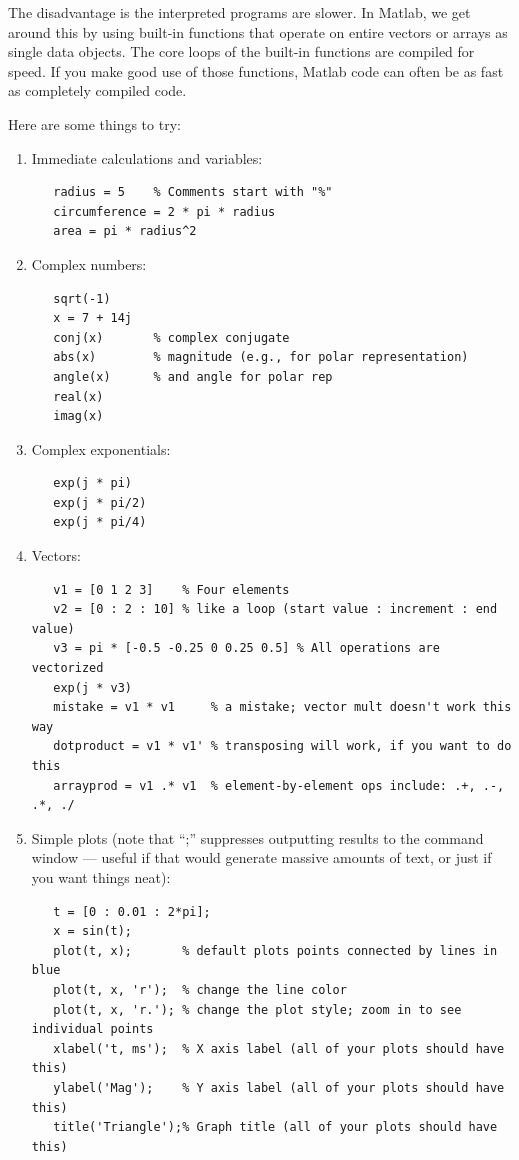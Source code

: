The disadvantage is the interpreted programs are slower. In Matlab, we
get around this by using built-in functions that operate on entire
vectors or arrays as single data objects. The core loops of the
built-in functions are compiled for speed. If you make good use of
those functions, Matlab code can often be as fast as completely
compiled code.

Here are some things to try:
\begin{enumerate}
\item Immediate calculations and variables:
\begin{verbatim}
   radius = 5    % Comments start with "%"
   circumference = 2 * pi * radius
   area = pi * radius^2
\end{verbatim}
\item Complex numbers:
\begin{verbatim}
   sqrt(-1)
   x = 7 + 14j
   conj(x)       % complex conjugate
   abs(x)        % magnitude (e.g., for polar representation)
   angle(x)      % and angle for polar rep
   real(x)
   imag(x)
\end{verbatim}
\item Complex exponentials:
\begin{verbatim}
   exp(j * pi)
   exp(j * pi/2)
   exp(j * pi/4)
\end{verbatim}
\item Vectors:
\begin{verbatim}
   v1 = [0 1 2 3]    % Four elements
   v2 = [0 : 2 : 10] % like a loop (start value : increment : end value)
   v3 = pi * [-0.5 -0.25 0 0.25 0.5] % All operations are vectorized
   exp(j * v3)
   mistake = v1 * v1     % a mistake; vector mult doesn't work this way
   dotproduct = v1 * v1' % transposing will work, if you want to do this
   arrayprod = v1 .* v1  % element-by-element ops include: .+, .-, .*, ./
\end{verbatim}
\item Simple plots (note that ``;'' suppresses outputting results to
  the command window --- useful if that would generate massive amounts
  of text, or just if you want things neat):
\label{it:simple-plots}
\begin{verbatim}
   t = [0 : 0.01 : 2*pi];
   x = sin(t);
   plot(t, x);       % default plots points connected by lines in blue
   plot(t, x, 'r');  % change the line color
   plot(t, x, 'r.'); % change the plot style; zoom in to see individual points
   xlabel('t, ms');  % X axis label (all of your plots should have this)
   ylabel('Mag');    % Y axis label (all of your plots should have this)
   title('Triangle');% Graph title (all of your plots should have this)
\end{verbatim}
\end{enumerate}

